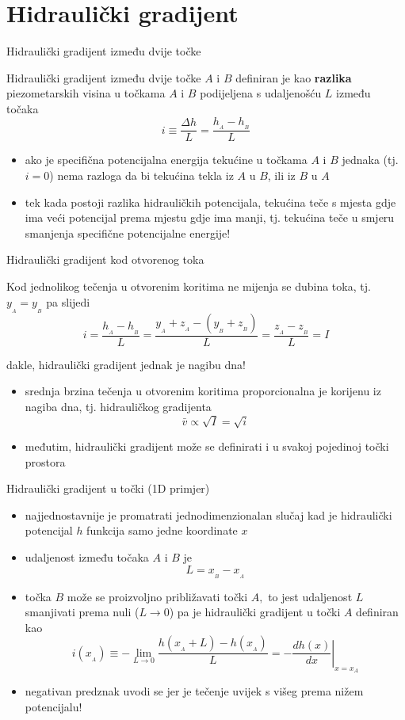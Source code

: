 \documentclass[croatian]{beamer}
\begin{document}
\section{Hidraulički gradijent}
\begin{frame}{Hidraulički gradijent između dvije točke}
\begin{alertblock}{}
\alert{Hidraulički gradijent} između dvije točke $A$ i $B$ definiran
je kao \textbf{razlika} piezometarskih visina u točkama $A$ i $B$
podijeljena s udaljenošću $L$ između točaka 
\[
i\equiv\frac{\Delta h}{L}=\frac{h_{_{A}}-h_{_{B}}}{L}
\]
\end{alertblock}
\begin{itemize}
\item ako je specifična potencijalna energija tekućine u točkama $A$ i
$B$ jednaka (tj. $i=0$) nema razloga da bi tekućina tekla iz $A$
u $B$, ili iz $B$ u $A$ 
\item tek kada postoji razlika hidrauličkih potencijala, tekućina teče s
mjesta gdje ima veći potencijal prema mjestu gdje ima manji, tj. \alert{tekućina teče u smjeru smanjenja specifične potencijalne energije!} 
\end{itemize}
\end{frame}
%
\begin{frame}{Hidraulički gradijent kod otvorenog toka}
\begin{alertblock}{}
\alert{Kod jednolikog tečenja} u otvorenim koritima ne mijenja
se dubina toka, tj. $y_{_{A}}=y_{_{B}}$ pa slijedi 
\[
i=\frac{h_{_{A}}-h_{_{B}}}{L}=\frac{y_{_{A}}+z_{_{A}}-(y_{_{B}}+z_{_{B}})}{L}=\frac{z_{_{A}}-z_{_{B}}}{L}=I
\]

dakle, \alert{hidraulički gradijent jednak je nagibu dna!} 
\end{alertblock}
\begin{itemize}
\item srednja brzina tečenja u otvorenim koritima proporcionalna je korijenu
iz nagiba dna, tj. hidrauličkog gradijenta 
\[
\bar{v}\propto\sqrt{I}=\sqrt{i}
\]
\item međutim, hidraulički gradijent može se definirati i u svakoj pojedinoj
točki prostora 
\end{itemize}
\end{frame}
%
\begin{frame}{Hidraulički gradijent u točki (1D primjer)}
\begin{itemize}
\item najjednostavnije je promatrati jednodimenzionalan slučaj kad je hidraulički
potencijal $h$ funkcija samo jedne koordinate $x$ 
\item udaljenost između točaka $A$ i $B$ je 
\[
L=x_{_{B}}-x_{_{A}}
\]
\item točka $B$ može se proizvoljno približavati točki $A,$ to jest udaljenost
$L$ smanjivati prema nuli ($L\rightarrow0$) pa je hidraulički gradijent
u točki $A$ definiran kao 
\[
i(x_{_{A}})\equiv-\lim_{L\rightarrow0}\frac{h(x_{_{A}}+L)-h(x_{_{A}})}{L}=\left.-\frac{dh(x)}{dx}\right|_{x=x_{A}}
\]
\item negativan predznak uvodi se jer je tečenje uvijek s višeg prema nižem
potencijalu! 
\end{itemize}
\end{frame}
\end{document}
